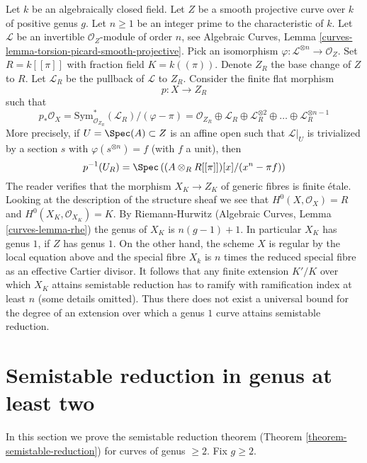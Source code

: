 \begin{example}
\label{example-extension-necessary-genus-one}
Let $k$ be an algebraically closed field. Let $Z$ be a smooth projective curve
over $k$ of positive genus $g$. Let $n \geq 1$ be an integer prime to the
characteristic of $k$. Let $\mathcal{L}$ be an
invertible $\mathcal{O}_Z$-module of order $n$, see
Algebraic Curves, Lemma \ref{curves-lemma-torsion-picard-smooth-projective}.
Pick an isomorphism $\varphi : \mathcal{L}^{\otimes n} \to \mathcal{O}_Z$.
Set $R = k[[\pi]]$ with fraction field $K = k((\pi))$. Denote $Z_R$
the base change of $Z$ to $R$. Let $\mathcal{L}_R$
be the pullback of $\mathcal{L}$ to $Z_R$.
Consider the finite flat morphism
$$
p : X \longrightarrow Z_R
$$
such that
$$
p_*\mathcal{O}_X =
\text{Sym}^*_{\mathcal{O}_{Z_R}}(\mathcal{L}_R)/(\varphi - \pi) =
\mathcal{O}_{Z_R} \oplus \mathcal{L}_R \oplus
\mathcal{L}_R^{\otimes 2} \oplus \ldots \oplus \mathcal{L}_R^{\otimes n - 1}
$$
More precisely, if $U = \Spec(A) \subset Z$ is an affine open
such that $\mathcal{L}|_U$ is trivialized by a section $s$
with $\varphi(s^{\otimes n}) = f$ (with $f$ a unit), then
$$
p^{-1}(U_R) = \Spec\left(
(A \otimes_R R[[\pi]])[x]/(x^n - \pi f)
\right)
$$
The reader verifies that the morphism $X_K \to Z_K$ of
generic fibres is finite \'etale. Looking at the description
of the structure sheaf we see that $H^0(X, \mathcal{O}_X) = R$
and $H^0(X_K, \mathcal{O}_{X_K}) = K$. By Riemann-Hurwitz
(Algebraic Curves, Lemma \ref{curves-lemma-rhe})
the genus of $X_K$ is $n(g - 1) + 1$. In particular $X_K$
has genus $1$, if $Z$ has genus $1$.
On the other hand, the scheme $X$ is regular
by the local equation above and the special fibre $X_k$ is
$n$ times the reduced special fibre as an effective Cartier divisor.
It follows that any finite extension $K'/K$ over which
$X_K$ attains semistable reduction has to ramify
with ramification index at least $n$ (some details omitted).
Thus there does not exist a universal bound for the
degree of an extension over which a genus $1$ curve attains
semistable reduction.
\end{example}






\section{Semistable reduction in genus at least two}
\label{section-semistable-reduction-genus-at-least-two}

\noindent
In this section we prove the semistable reduction theorem
(Theorem \ref{theorem-semistable-reduction}) for curves of genus $\geq 2$.
Fix $g \geq 2$.

